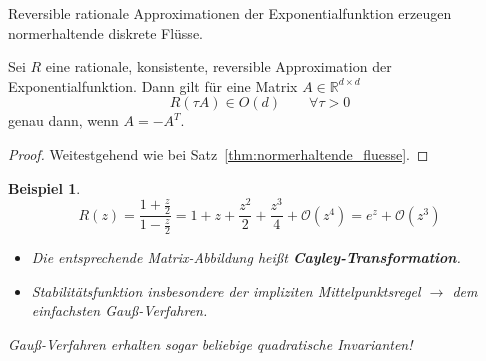 \documentclass[german]{scrreprt}
\newcommand{\begriff}[1]{\textbf{#1}}
\newcommand{\R}{\mathbb R}
\theoremstyle{plain}
\theoremstyle{nonumberplain}
\theoremstyle{nonumberplain}
\newtheorem{bsp}{Beispiel}
\theoremstyle{nonumberplain}
\newtheorem{proof}{Beweis}
\begin{document}
Reversible rationale Approximationen der Exponentialfunktion erzeugen normerhaltende diskrete Flüsse.

\begin{satz}
	Sei $R$ eine rationale, konsistente, reversible Approximation der Exponentialfunktion. Dann gilt für eine Matrix $A\in\R^{d\times d}$
	\begin{equation*}
	R(\tau A)\in O(d)\qquad\forall \tau > 0
	\end{equation*}
	genau dann, wenn $A=-A^T$.
\end{satz}
\begin{proof}
	Weitestgehend wie bei Satz~\ref{thm:normerhaltende_fluesse}.
\end{proof}

\begin{bsp}
	\begin{equation*}
	R(z) = \frac{1+\frac{z}{2}}{1-\frac{z}{2}}=1+z+\frac{z^2}{2} + \frac{z^3}{4} + \mathcal{O}(z^4) = e^z + \mathcal O(z^3)
	\end{equation*}
	\begin{itemize}
		\item Die entsprechende Matrix-Abbildung heißt \begriff{Cayley-Transformation}.
		\item Stabilitätsfunktion insbesondere der impliziten Mittelpunktsregel $\to$ dem einfachsten Gauß-Verfahren.
	\end{itemize}
	Gauß-Verfahren erhalten sogar beliebige quadratische Invarianten!
\end{bsp}
\end{document}
